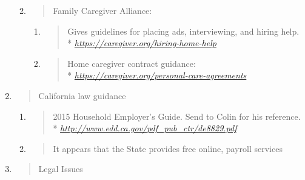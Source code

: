 \documentclass[]{article}
\begin{document}
\begin{enumerate}
  \begin{enumerate}
  \def\labelenumii{\Alph{enumii}.}
  \item
    \begin{quote}
    Family Caregiver Alliance:
    \end{quote}

    \begin{enumerate}
    \def\labelenumiii{\arabic{enumiii}.}
    \item
      \begin{quote}
      Gives guidelines for placing ads, interviewing, and hiring help. \\*
      \href{https://caregiver.org/hiring-home-help}{\emph{https://caregiver.org/hiring-home-help}}
      \end{quote}
    \item
      \begin{quote}
      Home caregiver contract guidance: \\*
      \href{https://caregiver.org/personal-care-agreements}{\emph{https://caregiver.org/personal-care-agreements}}
      \end{quote}
    \end{enumerate}
  \end{enumerate}
\item
  \begin{quote}
  California law guidance
  \end{quote}

  \begin{enumerate}
  \def\labelenumii{\Alph{enumii}.}
  \item
    \begin{quote}
    2015 Household Employer's Guide. Send to Colin for his reference. \\*
    \href{http://www.edd.ca.gov/pdf_pub_ctr/de8829.pdf}{\emph{http://www.edd.ca.gov/pdf\_pub\_ctr/de8829.pdf}}
    \end{quote}
  \item
    \begin{quote}
    It appears that the State provides free online, payroll services
    \end{quote}
  \end{enumerate}
\item
  \begin{quote}
  Legal Issues
  \end{quote}


\end{enumerate}
\end{document}

